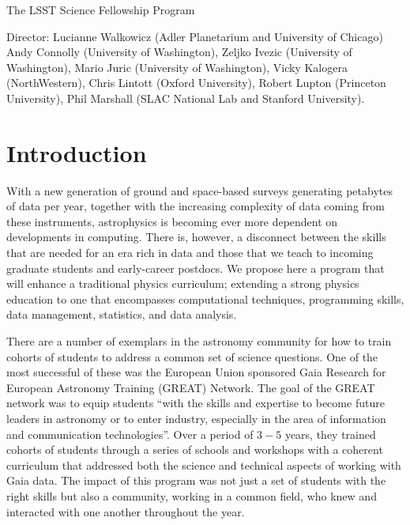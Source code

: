 \documentclass[nofootbib,floatfix,11pt]{article}
\begin{document}
 

\begin{center}
{\Large The  LSST Science Fellowship Program}

Director: Lucianne Walkowicz (Adler Planetarium and University of Chicago)\\
Andy Connolly (University of Washington),  Zeljko Ivezic (University of Washington), Mario Juric  (University of Washington), Vicky Kalogera (NorthWestern), Chris Lintott (Oxford University), Robert Lupton (Princeton University), Phil Marshall (SLAC National Lab and Stanford University).

\end{center}

\bigskip

\section{Introduction}

With a new generation of ground and space-based surveys generating petabytes of data per year, together with the increasing complexity of data coming from these instruments, astrophysics is becoming ever more dependent on developments in computing. There is, however, a disconnect between the skills that are needed for an era rich in data and those that we teach to incoming graduate students and early-career postdocs. We propose here a program that will enhance a traditional physics curriculum; extending a strong physics education to one that encompasses computational techniques, programming skills, data management, statistics, and data analysis.

There are a number of exemplars in the astronomy community for how to train cohorts of students to address a common set of science questions. One of the most successful of these was the European Union sponsored Gaia Research for European Astronomy Training (GREAT) Network. The goal of the GREAT network was to equip students ``with the skills and expertise to become future leaders in astronomy or to enter industry, especially in the area of information and communication technologies''.
Over a period of $3-5$ years, they trained cohorts of students through a series of schools and workshops with a coherent curriculum that addressed both the science and technical aspects of working with Gaia data. The impact of this program was not just a set of students with the right skills but also a community, working in a common field, who knew and interacted with one another throughout the year. 
\end{document}
